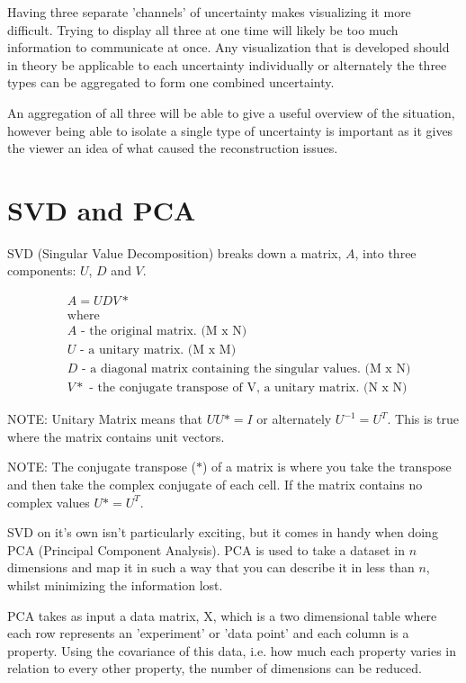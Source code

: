 Having three separate 'channels' of uncertainty makes visualizing it more difficult. Trying to display all three at one time will likely be too much information to communicate at once. Any visualization that is developed should in theory be applicable to each uncertainty individually or alternately the three types can be aggregated to form one combined uncertainty.

An aggregation of all three will be able to give a useful overview of the situation, however being able to isolate a single type of uncertainty is important as it gives the viewer an idea of what caused the reconstruction issues.

\newpage
\section{SVD and PCA}\label{background:svdpca}
SVD (Singular Value Decomposition) breaks down a matrix, $A$, into three components: $U$, $D$ and $V$.

\begin{align}
& A = UDV* \nonumber \\
& \text{where} \nonumber \\
& A \text{ - the original matrix. (M x N)} \nonumber \\
& U \text{ - a unitary matrix. (M x M)} \nonumber \\
& D \text{ - a diagonal matrix containing the singular values. (M x N)} \nonumber \\
& V* \text{ - the conjugate transpose of V, a unitary matrix. (N x N)} \nonumber
\end{align}

NOTE: Unitary Matrix means that $UU* = I$ or alternately $U^{-1} = U^T$. This is true where the matrix contains unit vectors.

NOTE: The conjugate transpose ($*$) of a matrix is where you take the transpose and then take the complex conjugate of each cell. If the matrix contains no complex values $U* = U^T$.

SVD on it’s own isn’t particularly exciting, but it comes in handy when doing PCA (Principal Component Analysis). PCA is used to take a dataset in $n$ dimensions and map it in such a way that you can describe it in less than $n$, whilst minimizing the information lost.

PCA takes as input a data matrix, X, which is a two dimensional table where each row represents an 'experiment' or 'data point' and each column is a property. Using the covariance of this data, i.e. how much each property varies in relation to every other property, the number of dimensions can be reduced.

